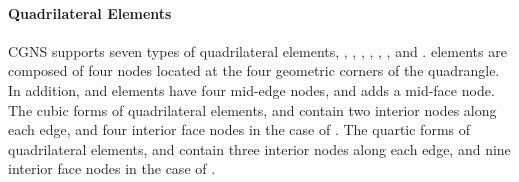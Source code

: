 {{{\paragraph{Quadrilateral Elements}
CGNS supports seven types of quadrilateral elements, ,
, , , , , and .
 elements are composed of four nodes located at the
four geometric corners of the quadrangle.
In addition,  and  elements have four
mid-edge nodes, and  adds a mid-face node.
The cubic forms of quadrilateral elements,  and 
contain two interior nodes along each edge, and four interior face nodes
in the case of .
The quartic forms of quadrilateral elements,  and 
contain three interior nodes along each edge, and nine interior face nodes
in the case of .

\newpage
{}

}}}
